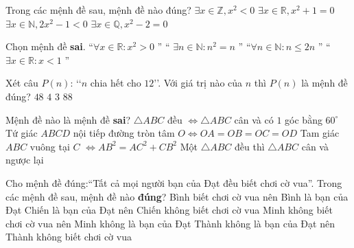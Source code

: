 \begin{ex}%
	Trong các mệnh đề sau, mệnh đề  nào đúng?
	\choice 
		 {$\exists x\in \mathbb{Z}, x^2<0$}
		{$\exists x\in  \mathbb{R}, x^2+1=0$}
		 {\True $\exists x\in \mathbb{N}, 2x^2-1<0$}
		 {$\exists x\in \mathbb{Q}, x^2-2=0$}
\end{ex}

\begin{ex}%
	Chọn mệnh  đề \textbf{sai}.
	\choice 
		 {\True “$\forall x\in \mathbb{R}\colon x^2>0$ ”}
		{“ $\exists  n\in \mathbb{N}\colon n^2=n$ ”}
		{“$\forall n\in \mathbb{N}\colon n\leqslant  2n$ ”}
		{“$\exists x\in \mathbb{R}\colon x<1$  ”}
\end{ex}

\begin{ex}%
	Xét câu $P(n)$: \lq\lq $n$ chia hết cho $12$\rq\rq. Với giá trị  nào của $n$ thì $P(n)$ là mệnh đề đúng?
	\choice 
		 {\True $48 $}
		{$4 $} 
		{$  3$}
		 {$88 $}
\end{ex}

\begin{ex}%
	Mệnh đề  nào là mệnh đề \textbf{sai}?
	 \choice
		{$\triangle  ABC $ đều $\Leftrightarrow \triangle ABC$ cân và có $1$ góc bằng $60^\circ$}
		{Tứ giác $ABCD$ nội tiếp đường tròn tâm $O\Leftrightarrow  OA=OB=OC=OD$}
		{Tam giác $ABC$ vuông tại $C$  $\Leftrightarrow AB^2=AC^2+CB^2$}
		{\True Một  $\triangle ABC$ đều thì $\triangle ABC$ cân và ngược lại}
\end{ex}

\begin{ex}%
	Cho mệnh đề đúng:``Tất cả mọi người  bạn của Đạt đều biết chơi cờ vua''. Trong các mệnh đề sau, mệnh đề nào \textbf{đúng}?
	 \choice
		{Bình biết chơi cờ vua nên Bình là  bạn của Đạt}
		{Chiến là bạn của Đạt nên Chiến  không biết chơi cờ vua }
		{\True Minh  không biết chơi cờ vua nên Minh không là bạn của Đạt}
		 {Thành không là bạn của Đạt nên Thành không biết chơi cờ vua}
\end{ex}

